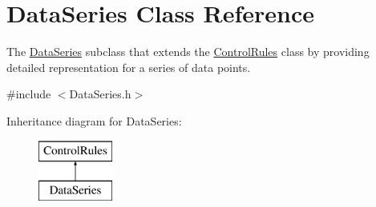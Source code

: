\hypertarget{classDataSeries}{}\section{Data\+Series Class Reference}
\label{classDataSeries}


The \mbox{\hyperlink{classDataSeries}{Data\+Series}} subclass that extends the \mbox{\hyperlink{classControlRules}{Control\+Rules}} class by providing detailed representation for a series of data points.  




{\ttfamily \#include $<$Data\+Series.\+h$>$}

Inheritance diagram for Data\+Series\+:\begin{figure}[H]
\begin{center}
\leavevmode
\includegraphics[height=2.000000cm]{classDataSeries}
\end{center}
\end{figure}
